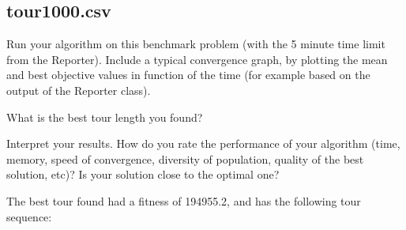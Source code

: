 \documentclass[a4paper,10pt]{article}
\newcommand{\ReplaceMe}[1]{{\color{blue}#1}}
\begin{document}

\subsection{tour1000.csv}

\ReplaceMe{Run your algorithm on this benchmark problem (with the 5 minute time limit from the Reporter). Include a typical convergence graph, by plotting the mean and best objective values in function of the time (for example based on the output of the Reporter class). 

What is the best tour length you found? 

Interpret your results. How do you rate the performance of your algorithm (time, memory, speed of convergence, diversity of population, quality of the best solution, etc)? Is your solution close to the optimal one? }

The best tour found had a fitness of 194955.2, and has the following tour sequence:
\end{document}
